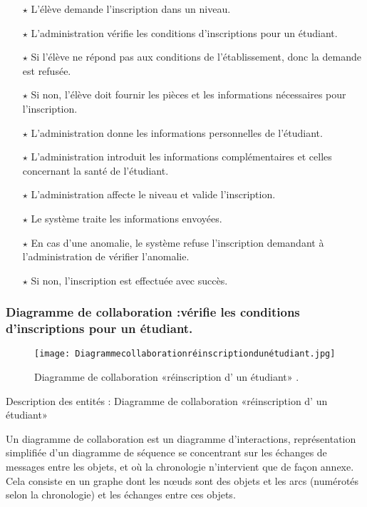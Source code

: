 \begin{itemize}	
\item[$\star$]L’élève demande l’inscription dans un niveau.
\item[$\star$] L’administration vérifie les conditions d’inscriptions pour un étudiant.
\item[$\star$] Si l’élève ne répond pas aux conditions de l’établissement, donc la demande est refusée.
\item[$\star$] Si non, l’élève doit fournir les pièces et les informations nécessaires pour
l’inscription.
\item[$\star$] L’administration donne les informations personnelles de l’étudiant.
\item[$\star$] L’administration introduit les informations complémentaires et celles concernant la santé de l’étudiant.
\item[$\star$] L’administration affecte le niveau et valide l’inscription.
\item[$\star$] Le système traite les informations envoyées.
\item[$\star$] En cas d’une anomalie, le système refuse l’inscription demandant à l’administration de vérifier l’anomalie.
\item[$\star$] Si non, l’inscription est effectuée avec succès.
\end{itemize}	
\subsubsection{Diagramme de collaboration :vérifie les conditions d’inscriptions pour un étudiant.}
\begin{figure}[ht]
	\centering
	\texttt{[image: Diagrammecollaborationréinscriptiondunétudiant.jpg]}
	\caption{Diagramme de collaboration «réinscription d' un étudiant» .}
	\label{fig:Diagramme de collaboration réinscription d' un étudiant  }
\end{figure}
\FloatBarrier
{\Large \color{cyan} Description des entités : Diagramme de collaboration «réinscription d' un étudiant»}

Un diagramme de collaboration est un diagramme d'interactions, représentation simplifiée d'un diagramme de séquence se concentrant sur les échanges de messages entre les objets, et où la chronologie n'intervient que de façon annexe.\\
Cela consiste en un graphe dont les nœuds sont des objets et les arcs (numérotés selon la chronologie) et les échanges entre ces objets.


